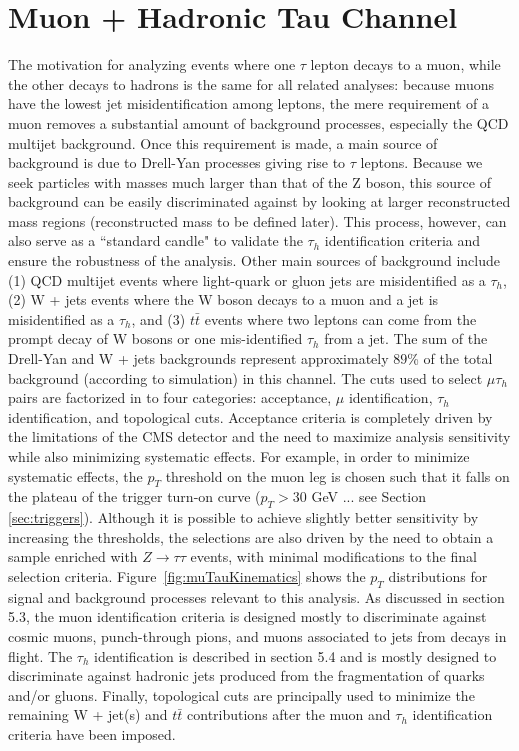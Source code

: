 \section{Muon + Hadronic Tau Channel}\label{sec:muTauhad}

The motivation for analyzing events where one $\tau$ lepton decays to a muon,
while the other decays to hadrons is the same for all \ditau related analyses: because
muons have the lowest jet misidentification among leptons, the mere requirement of a
muon removes a substantial amount of background processes, especially the QCD multijet background. Once this requirement
is made, a main source of background is due to Drell-Yan
processes giving rise to $\tau$ leptons. Because we seek particles with masses
much larger than that of the Z boson, this source of background can be easily discriminated
against by looking at larger reconstructed \ditau mass regions (reconstructed mass to be defined later). This process,
however, can also serve as a ``standard candle" to validate the $\tau_{h}$ identification criteria and
ensure the robustness of the analysis. Other main sources 
of background include (1) QCD multijet events where light-quark or gluon jets are misidentified 
as a $\tau_{h}$, (2) W + jets events where the W boson decays to a muon and a jet is
misidentified as a $\tau_{h}$, and (3) $t\bar{t}$ events where two leptons can
come from the prompt decay of W bosons or one mis-identified $\tau_{h}$ from a jet. The sum of the Drell-Yan and W + jets backgrounds represent 
approximately $89$\% of the total background (according to simulation) in this channel.  The 
cuts used to select $\mu\tau_{h}$ pairs are factorized in to four categories: acceptance, 
$\mu$ identification, $\tau_{h}$ identification, and topological cuts. Acceptance criteria is completely
driven by the limitations of the CMS detector and the need to maximize analysis
sensitivity while also minimizing systematic effects. For example, in order to minimize systematic effects, the
$p_{T}$ threshold on the muon leg is chosen such that it falls on the plateau of the trigger turn-on curve ($p_{T} > 30$ GeV ... see Section \ref{sec:triggers}). 
Although it is possible to achieve slightly better sensitivity by increasing the thresholds,
the selections are also driven by the need to obtain a sample enriched with $Z\to\tau\tau$ events, 
with minimal modifications to the final selection criteria. 
Figure~\ref{fig:muTauKinematics} shows 
the $p_{T}$ distributions for signal and background processes relevant to this analysis. 
As discussed in section 5.3, the muon identification criteria is designed mostly to discriminate
against cosmic muons, punch-through pions, and muons associated to jets 
from decays in flight. The $\tau_{h}$ identification is described in section 5.4 and is mostly designed to
discriminate against hadronic jets produced from the fragmentation of quarks and/or
gluons. Finally, topological cuts are principally used to minimize the remaining W + jet(s)
and $t\bar{t}$ contributions after the muon and $\tau_{h}$ identification criteria have been
imposed. 

